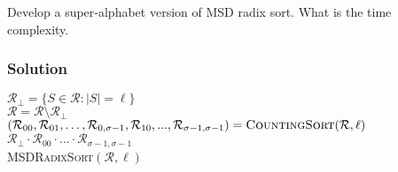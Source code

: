 \documentclass[10pt]{article}
\begin{document}
\noindent Develop a super-alphabet version of MSD radix sort. What is the time complexity.
\color{black}

\subsubsection*{Solution}
\begin{algorithm}
$\mathcal{R}_{\bot} = \{ S \in \mathcal{R} \colon |S| = \ell \}$ \\
$\mathcal{R} = \mathcal{R} \setminus \mathcal{R}_{\bot}$ \\
$(\mathcal{R}_{00}, \mathcal{R}_{01}, \dots, \mathcal{R}_{0,\sigma - 1}, \mathcal{R}_{10}, ..., \mathcal{R}_{\sigma - 1, \sigma - 1}) = \textsc{CountingSort}(\mathcal{R}, \ell)$ \\
\KwRet $\mathcal{R}_{\bot} \cdot \mathcal{R}_{00} \cdot \dots \cdot \mathcal{R}_{\sigma - 1, \sigma - 1}$ \\
\caption{\textsc{MSDRadixSort}$(\mathcal{R}, \ell)$}
\end{algorithm}
\end{document}
